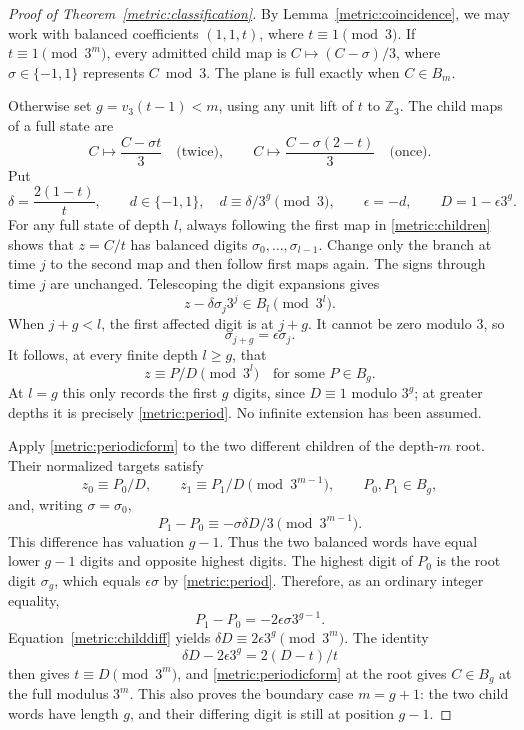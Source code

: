 \begin{proof}[Proof of Theorem~\ref{metric:classification}]
By Lemma~\ref{metric:coincidence}, we may work with balanced
coefficients $(1,1,t)$, where $t\equiv1\pmod3$.
If $t\equiv1\pmod{3^m}$, every admitted child map is
$C\mapsto(C-\sigma)/3$, where $\sigma\in\{-1,1\}$ represents
$C\bmod3$. The plane is full exactly when $C\in B_m$.

Otherwise set $g=v_3(t-1)<m$, using any unit lift of $t$ to
$\mathbb Z_3$. The child maps of a full state are
\begin{equation}\label{metric:children}
 C\longmapsto\frac{C-\sigma t}{3}\quad\text{(twice)},
 \qquad
 C\longmapsto\frac{C-\sigma(2-t)}{3}\quad\text{(once)}.
\end{equation}
Put
\[
 \delta=\frac{2(1-t)}t,\qquad
 d\in\{-1,1\},\quad d\equiv\delta/3^g\pmod3,
 \qquad\epsilon=-d,\qquad D=1-\epsilon3^g.
\]
For any full state of depth $l$, always following the first map in
\eqref{metric:children} shows that $z=C/t$ has balanced digits
$\sigma_0,\ldots,\sigma_{l-1}$. Change only the branch at time $j$
to the second map and then follow first maps again. The signs through
time $j$ are unchanged. Telescoping the digit expansions gives
\[
                     z-\delta\sigma_j3^j\in B_l\pmod{3^l}.
\]
When $j+g<l$, the first affected digit is at $j+g$. It cannot be zero
modulo $3$, so
\begin{equation}\label{metric:period}
                         \sigma_{j+g}=\epsilon\sigma_j.
\end{equation}
It follows, at every finite depth $l\geq g$, that
\begin{equation}\label{metric:periodicform}
                  z\equiv P/D\pmod{3^l}\quad\text{for some }P\in B_g.
\end{equation}
At $l=g$ this only records the first $g$ digits, since $D\equiv1$
modulo $3^g$; at greater depths it is precisely
\eqref{metric:period}. No infinite extension has been assumed.

Apply \eqref{metric:periodicform} to the two different children of
the depth-$m$ root. Their normalized targets satisfy
\[
 z_0\equiv P_0/D,\qquad z_1\equiv P_1/D\pmod{3^{m-1}},
 \qquad P_0,P_1\in B_g,
\]
and, writing $\sigma=\sigma_0$,
\begin{equation}\label{metric:childdiff}
               P_1-P_0\equiv-\sigma\delta D/3\pmod{3^{m-1}}.
\end{equation}
This difference has valuation $g-1$. Thus the two balanced words
have equal lower $g-1$ digits and opposite highest digits.
The highest digit of $P_0$ is the root digit $\sigma_g$, which
equals $\epsilon\sigma$ by \eqref{metric:period}. Therefore, as
an ordinary integer equality,
\[
                    P_1-P_0=-2\epsilon\sigma3^{g-1}.
\]
Equation~\eqref{metric:childdiff} yields
$\delta D\equiv2\epsilon3^g\pmod{3^m}$. The identity
\[
                     \delta D-2\epsilon3^g=2(D-t)/t
\]
then gives $t\equiv D\pmod{3^m}$, and
\eqref{metric:periodicform} at the root gives $C\in B_g$ at the
full modulus $3^m$. This also proves the boundary case $m=g+1$:
the two child words have length $g$, and their differing digit is
still at position $g-1$.


\end{proof}
